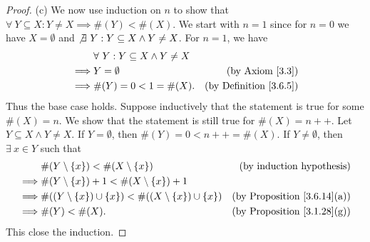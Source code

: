 \begin{proof}{(c)}
    We now use induction on \(n\) to show that \(\forall\ Y \subseteq X : Y \neq X \implies \#(Y) < \#(X)\).
    We start with \(n = 1\) since for \(n = 0\) we have \(X = \emptyset\) and \(\not\exists\ Y : Y \subseteq X \land Y \neq X\).
    For \(n = 1\), we have
    \begin{align*}
                 & \forall\ Y : Y \subseteq X \land Y \neq X                                      \\
        \implies & Y = \emptyset                             & \text{(by Axiom \ref{3.3})}        \\
        \implies & \#(Y) = 0 < 1 = \#(X).                    & \text{(by Definition \ref{3.6.5})}
    \end{align*}
    Thus the base case holds.
    Suppose inductively that the statement is true for some \(\#(X) = n\).
    We show that the statement is still true for \(\#(X) = n++\).
    Let \(Y \subseteq X \land Y \neq X\).
    If \(Y = \emptyset\), then \(\#(Y) = 0 < n++ = \#(X)\).
    If \(Y \neq \emptyset\), then \(\exists\ x \in Y\) such that
    \begin{align*}
                 & \#(Y \setminus \{x\}) < \#(X \setminus \{x\})                           & \text{(by induction hypothesis)}        \\
        \implies & \#(Y \setminus \{x\}) + 1 < \#(X \setminus \{x\}) + 1                                                             \\
        \implies & \#((Y \setminus \{x\}) \cup \{x\}) < \#((X \setminus \{x\}) \cup \{x\}) & \text{(by Proposition \ref{3.6.14}(a))} \\
        \implies & \#(Y) < \#(X).                                                          & \text{(by Proposition \ref{3.1.28}(g))}
    \end{align*}
    This close the induction.
\end{proof}

